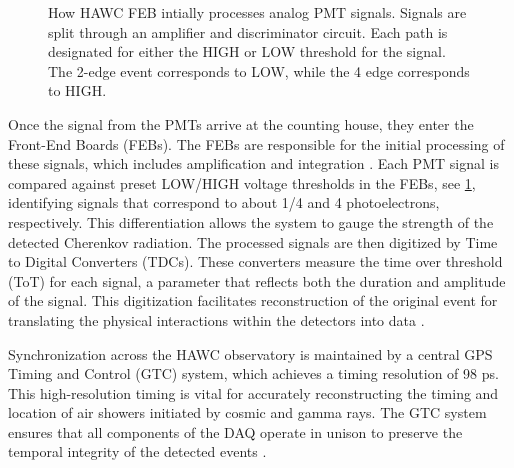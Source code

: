\begin{figure}
    \caption{How HAWC FEB intially processes analog PMT signals. Signals are split through an amplifier and discriminator circuit. Each path is designated for either the HIGH or LOW threshold for the signal. The 2-edge event corresponds to LOW, while the 4 edge corresponds to HIGH.}
    \label{fig:tot_threholds}
\end{figure}

Once the signal from the PMTs arrive at the counting house, they enter the Front-End Boards (FEBs).
The FEBs are responsible for the initial processing of these signals, which includes amplification and integration \cite{Milagro_DAQ}.
Each PMT signal is compared against preset LOW/HIGH voltage thresholds in the FEBs, see \cref{fig:tot_threholds}, identifying signals that correspond to about 1/4 and 4 photoelectrons, respectively.
This differentiation allows the system to gauge the strength of the detected Cherenkov radiation.
The processed signals are then digitized by Time to Digital Converters (TDCs).
These converters measure the time over threshold (ToT) for each signal, a parameter that reflects both the duration and amplitude of the signal.
This digitization facilitates reconstruction of the original event for translating the physical interactions within the detectors into data \cite{HHAWC_NIM,HAWC_DAQ_NIM,Milagro_DAQ}.

Synchronization across the HAWC observatory is maintained by a central GPS Timing and Control (GTC) system, which achieves a timing resolution of 98 ps.
This high-resolution timing is vital for accurately reconstructing the timing and location of air showers initiated by cosmic and gamma rays.
The GTC system ensures that all components of the DAQ operate in unison to preserve the temporal integrity of the detected events \cite{HHAWC_NIM,hawc_daq_thesis}.

